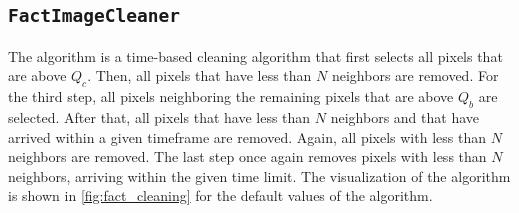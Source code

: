 \subsection*{\texttt{FactImageCleaner}}
\vspace{-0.5cm}
The \fact{} algorithm \cite{temme_thesis, temme_diploma} is a time-based cleaning algorithm that first selects all pixels that are above
\(Q_c\). Then, all pixels that have less than \(N\) neighbors are removed.
For the third step, all pixels neighboring
the remaining pixels that are above \(Q_b\) are selected. After that, all
pixels that have less than \(N\) neighbors and that have arrived within a given timeframe are removed.
Again, all pixels with less than \(N\) neighbors are removed. The last step once again removes pixels with less than
\(N\) neighbors, arriving within the given time limit. The visualization of the algorithm is shown in
\autoref{fig:fact_cleaning} for the default values of the algorithm.
\vspace{-0.75cm}
